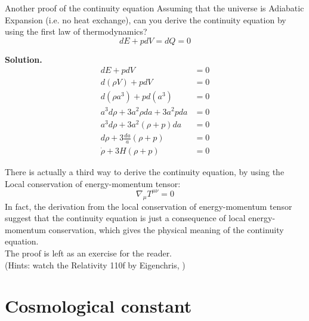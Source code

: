 \clearpage
\begin{example}{Another proof of the continuity equation}{}
    Assuming that the universe is Adiabatic Expansion (i.e. no heat exchange), can you derive the continuity equation by using the first law of thermodynamics?
    \[
        dE + pdV = dQ = 0
    \]

    \bigskip\textbf{Solution.}\quad \\
    \begin{align*}
        dE + pdV &= 0 \\
        d(\rho V) + pdV &= 0 \\
        d(\rho a^3) + pd(a^3) &= 0 \\
        a^3 d\rho + 3a^2 \rho da + 3a^2 p da &= 0 \\
        a^3 d\rho + 3a^2 (\rho + p) da &= 0 \\
        d\rho + 3\frac{da}{a} (\rho + p) &= 0 \\
        \dot{\rho} + 3H(\rho + p) &= 0
    \end{align*}
\end{example}

\bigskip \noindent
\begin{extra}
    There is actually a third way to derive the continuity equation, by using the Local conservation of energy-momentum tensor:
    \[
        \nabla_\mu T^{\mu\nu} = 0
    \]
    In fact, the derivation from the local conservation of energy-momentum tensor suggest that the continuity equation is just a consequence of local energy-momentum conservation, which gives the physical meaning of the continuity equation. \\

    The proof is left as an exercise for the reader. \\
    (Hints: watch the Relativity 110f by Eigenchris, \cite{Eigenchris_Relativity_Course})
\end{extra}







\clearpage
\section{Cosmological constant}
